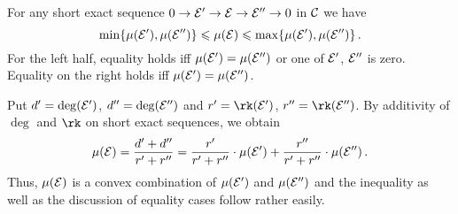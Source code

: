 \documentclass[a4paper, 10pt, oneside, DIV=9, chapterprefix=true, numbers=enddot,bibliography=totoc]{scrbook}
\begin{document}
\begin{lem*}\label{lem*:MuOnSES}
	For any short exact sequence $0\morphism \Ee'\morphism \Ee\morphism \Ee''\morphism 0$ in $\mathcal{C}$ we have 
	\begin{equation*}
		\min\{\mu(\mathcal{E}'),\mu(\mathcal{E}'')\}\leqslant \mu(\mathcal{E})\leqslant \max\{\mu(\mathcal{E}'),\mu(\mathcal{E}'')\}\,.
	\end{equation*}
	For the left half, equality holds iff $\mu(\mathcal{E}')=\mu(\mathcal{E}'')$ or one of $\mathcal{E}'$, $\mathcal{E}''$ is zero. Equality on the right holds iff $\mu(\mathcal{E}')=\mu(\mathcal{E}'')$.
\end{lem*}
\begin{proof*}
	Put $d'=\deg(\mathcal{E}')$, $d''=\deg(\mathcal{E}'')$ and $r'=\rk(\Ee')$, $r''=\rk(\Ee'')$. By additivity of $\deg$ and $\rk$ on short exact sequences, we obtain
	\begin{equation*}
		\mu(\mathcal{E})=\frac{d'+d''}{r'+r''}=\frac{r'}{r'+r''}\cdot\mu(\mathcal{E}')+\frac{r''}{r'+r''}\cdot\mu(\mathcal{E}'')\,.
	\end{equation*}
	Thus, $\mu(\mathcal{E})$ is a convex combination of $\mu(\mathcal{E}')$ and $\mu(\mathcal{E}'')$ and the inequality as well as the discussion of equality cases follow rather easily.
\end{proof*}
\end{document}

